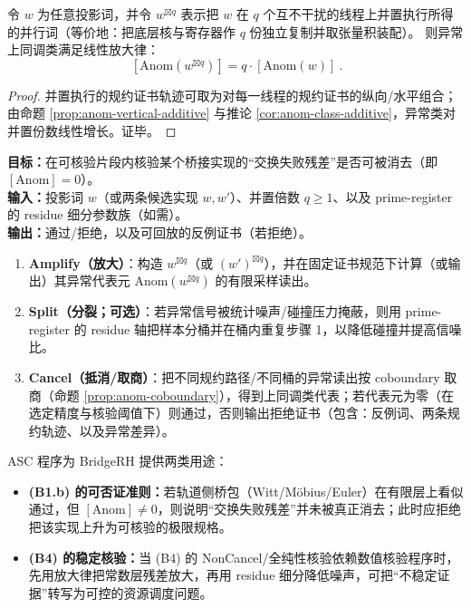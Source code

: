 \begin{proposition}\label{prop:anom-amplification}
令 $w$ 为任意投影词，并令 $w^{\boxtimes q}$ 表示把 $w$ 在 $q$ 个互不干扰的线程上并置执行所得的并行词（等价地：把底层核与寄存器作 $q$ 份独立复制并取张量积装配）。
则异常上同调类满足线性放大律：
$$
\boxed{\ [\mathrm{Anom}(w^{\boxtimes q})]=q\cdot[\mathrm{Anom}(w)]\ }.
$$
\end{proposition}
\begin{proof}
并置执行的规约证书轨迹可取为对每一线程的规约证书的纵向/水平组合；由命题 \ref{prop:anom-vertical-additive} 与推论 \ref{cor:anom-class-additive}，异常类对并置份数线性增长。证毕。
\end{proof}

\begin{algorithm}\label{alg:asc-protocol}
\textbf{目标：}在可核验片段内核验某个桥接实现的“交换失败残差”是否可被消去（即 $[\mathrm{Anom}]=0$）。\\
\textbf{输入：}投影词 $w$（或两条候选实现 $w,w'$）、并置倍数 $q\ge 1$、以及 prime-register 的 residue 细分参数族（如需）。\\
\textbf{输出：}通过/拒绝，以及可回放的反例证书（若拒绝）。
\begin{enumerate}
  \item \textbf{Amplify（放大）}：构造 $w^{\boxtimes q}$（或 $(w')^{\boxtimes q}$），并在固定证书规范下计算（或输出）其异常代表元 $\mathrm{Anom}(w^{\boxtimes q})$ 的有限采样读出。
  \item \textbf{Split（分裂；可选）}：若异常信号被统计噪声/碰撞压力掩蔽，则用 prime-register 的 residue 轴把样本分桶并在桶内重复步骤 1，以降低碰撞并提高信噪比。
  \item \textbf{Cancel（抵消/取商）}：把不同规约路径/不同桶的异常读出按 coboundary 取商（命题 \ref{prop:anom-coboundary}），得到上同调类代表；若代表元为零（在选定精度与核验阈值下）则通过，否则输出拒绝证书（包含：反例词、两条规约轨迹、以及异常差异）。
\end{enumerate}
\end{algorithm}

\begin{remark}\label{rem:asc-to-bridge}
ASC 程序为 BridgeRH 提供两类用途：
\begin{itemize}
  \item \textbf{(B1.b) 的可否证准则：}若轨道侧桥包（Witt/Möbius/Euler）在有限层上看似通过，但 $[\mathrm{Anom}]\neq 0$，则说明“交换失败残差”并未被真正消去；此时应拒绝把该实现上升为可核验的极限规格。
  \item \textbf{(B4) 的稳定核验：}当 (B4) 的 NonCancel/全纯性核验依赖数值核验程序时，先用放大律把常数层残差放大，再用 residue 细分降低噪声，可把“不稳定证据”转写为可控的资源调度问题。
\end{itemize}
\end{remark}

